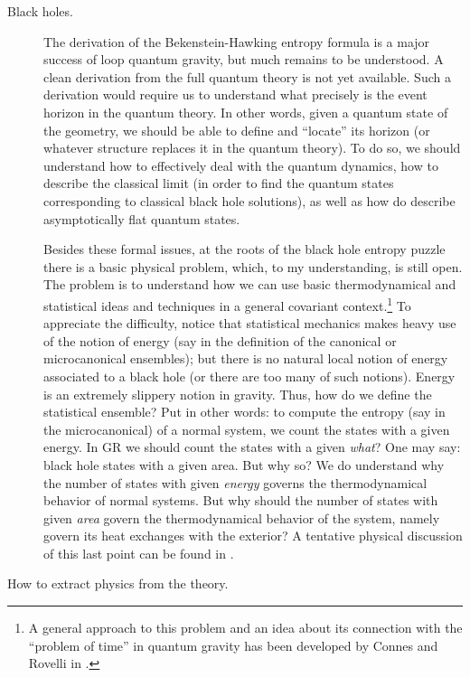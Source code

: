 \begin{description}
\item[Black holes.]

The derivation of the Bekenstein-Hawking entropy formula 
is a major success of loop quantum gravity, but much 
remains to be understood.   A clean derivation from the 
full quantum theory is not yet available.  Such a 
derivation would require us to understand what precisely 
is the event horizon in the quantum theory.  In other 
words, given a quantum state of the geometry, we should be 
able to define and ``locate'' its horizon (or whatever 
structure replaces it in the quantum theory).  To do so, 
we should understand how to effectively deal with the 
quantum dynamics, how to describe the classical limit (in 
order to find the quantum states corresponding to 
classical black hole solutions), as well as how do describe 
asymptotically flat quantum states.  

Besides these formal issues, at the roots of the black hole 
entropy puzzle there is a basic physical problem, which, to my 
understanding, is still open.  The problem is to understand how we 
can use basic thermodynamical and statistical ideas and techniques 
in a general covariant context.\footnote{A general approach to
this problem and an idea about its connection with the  
``problem of time'' in quantum gravity has been developed by Connes 
and Rovelli in \cite{RovelliStat1,RovelliStat2,ConnesRovelli}.} To 
appreciate the difficulty, notice that statistical mechanics makes 
heavy use of the notion of energy (say in the definition of the 
canonical or microcanonical ensembles); but there is no natural 
local notion of energy associated to a black hole (or there are 
too many of such notions).  Energy is an extremely slippery notion 
in gravity.  Thus, how do we define the statistical ensemble?  Put 
in other words: to compute the entropy (say in the microcanonical) 
of a normal system, we count the states with a given energy.  In 
GR we should count the states with a given {\em what\/}?  One may 
say: black hole states with a given area.  But why so?  We do 
understand why the number of states with given {\em energy\/} 
governs the thermodynamical behavior of normal systems.  But why 
should the number of states with given {\em area\/} govern the 
thermodynamical behavior of the system, namely govern its heat 
exchanges with the exterior?  A tentative physical discussion of 
this last point can be found in \cite{RovelliAscona}.
 

\item[How to extract physics from the theory.]
	

\end{description}
